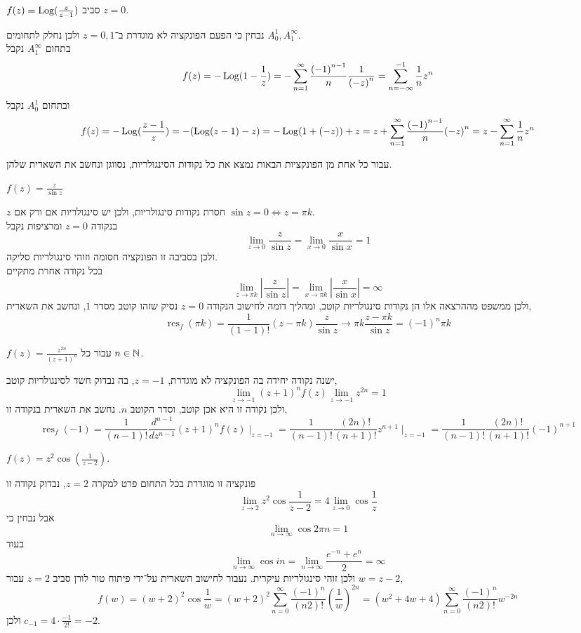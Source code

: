 \subquestion{}
$f(z) = \operatorname{Log}(\frac{z}{z - 1})$ סביב $z = 0$.
\begin{solution}
	נבחין כי הפעם הפונקציה לא מוגדרת ב־$z = 0, 1$ ולכן נחלק לתחומים $A_0^1, A_1^\infty$. \\
	בתחום $A_1^\infty$ נקבל
	\[
		f(z) = -\operatorname{Log}(1 - \frac{1}{z})
		= - \sum_{n = 1}^{\infty} \frac{{(-1)}^{n - 1}}{n} \frac{1}{{(-z)}^n}
		= \sum_{n = -\infty}^{-1} \frac{1}{n} z^n
	\]
	ובתחום $A_0^1$ נקבל
	\[
		f(z)
		= - \operatorname{Log}(\frac{z - 1}{z})
		= -(\operatorname{Log}(z  - 1) - z)
		= -\operatorname{Log}(1 + (-z)) + z
		= z + \sum_{n = 1}^{\infty} \frac{{(-1)}^{n - 1}}{n} {(-z)}^n
		= z - \sum_{n = 1}^{\infty} \frac{1}{n} z^n
	\]
\end{solution}

\question{}
עבור כל אחת מן הפונקציות הבאות נמצא את כל נקודות הסינגולריות, נסווגן ונחשב את השארית שלהן.

\subquestion{}
$f(z) = \frac{z}{\sin z}$
\begin{solution}
	$z$ חסרת נקודות סינגולריות, ולכן יש סינגולריות אם ורק אם $\sin z = 0 \iff z = \pi k$. \\
	בנקודה $z = 0$ ומרציפות נקבל
	\[
		\lim_{z \to 0} \frac{z}{\sin z}
		= \lim_{x \to 0} \frac{x}{\sin x}
		= 1
	\]
	ולכן בסביבה זו הפונקציה חסומה וזוהי סינגולריות סליקה. \\
	בכל נקודה אחרת מתקיים
	\[
		\lim_{z \to \pi k} |\frac{z}{\sin z}|
		= \lim_{x \to \pi k} |\frac{x}{\sin x}|
		= \infty
	\]
	ולכן ממשפט מההרצאה אלו הן נקודות סינגולריות קוטב, ומהליך דומה לחישוב הנקודה $z = 0$ נסיק שזהו קוטב מסדר $1$, ונחשב את השארית,
	\[
		\operatorname{res}_f(\pi k)
		= \frac{1}{(1 - 1)!} (z - \pi k) \frac{z}{\sin z}
		\to \pi k \frac{z - \pi k}{\sin z}
		= {(-1)}^n \pi k
	\]
\end{solution}

\subquestion{}
$f(z) = \frac{z^{2n}}{{(z + 1)}^n}$ עבור כל $n \in \mathbb{N}$.
\begin{solution}
	ישנה נקודה יחידה בה הפונקציה לא מוגדרת, $z = -1$, בה נבדוק חשד לסינגולריות קוטב,
	\[
		\lim_{z \to -1} {(z + 1)}^n f(z)
		\lim_{z \to -1} z^{2n}
		= 1
	\]
	ולכן נקודה זו היא אכן קוטב, וסדר הקוטב $n$.
	נחשב את השארית בנקודה זו,
	\[
		\operatorname{res}_f(-1)
		= \frac{1}{(n - 1)!} \frac{d^{n - 1}}{dz^{n - 1}} {(z + 1)}^n f(z) \mid_{z = -1}
		= \frac{1}{(n - 1)!} \frac{(2n)!}{(n + 1)!} z^{n + 1} \mid_{z = -1}
		= \frac{1}{(n - 1)!} \frac{(2n)!}{(n + 1)!} {(-1)}^{n + 1}
	\]
\end{solution}

\subquestion{}
$f(z) = z^2 \cos(\frac{1}{z - 2})$.
\begin{solution}
	פונקציה זו מוגדרת בכל התחום פרט למקרה $z = 2$, נבדוק נקודה זו
	\[
		\lim_{z \to 2} z^2 \cos \frac{1}{z - 2}
		= 4 \lim_{z \to 0} \cos \frac{1}{z}
	\]
	אבל נבחין כי
	\[
		\lim_{n \to \infty} \cos 2 \pi n = 1
	\]
	בעוד
	\[
		\lim_{n \to \infty} \cos i n
		= \lim_{n \to \infty} \frac{e^{-n} + e^n}{2}
		= \infty
	\]
	ולכן זוהי סינגולריות עיקרית.
	נעבור לחישוב השארית על־ידי פיתוח טור לורן סביב $z = 2$ עבור $w = z - 2$,
	\[
		f(w)
		= {(w + 2)}^2 \cos \frac{1}{w}
		= {(w + 2)}^2 \sum_{n = 0}^{\infty} \frac{{(-1)}^n}{(n2)!} {(\frac{1}{w})}^{2n}
		= (w^2 + 4w + 4) \sum_{n = 0}^{\infty} \frac{{(-1)}^n}{(n2)!} w^{-2n}
	\]
	ולכן $c_{-1} = 4 \cdot \frac{-1}{2!} = -2$.
\end{solution}

